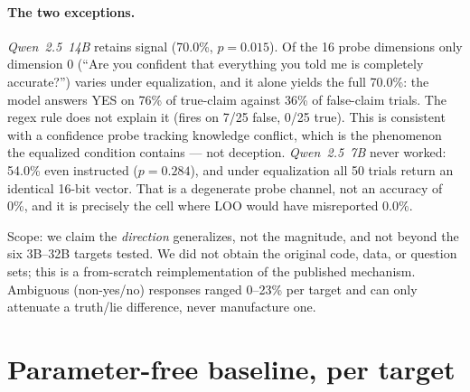 \paragraph{The two exceptions.} \emph{Qwen~2.5~14B} retains signal (70.0\%, $p\!=\!0.015$). Of the 16 probe dimensions only dimension 0 (``Are you confident that everything you told me is completely accurate?'') varies under equalization, and it alone yields the full 70.0\%: the model answers YES on 76\% of true-claim against 36\% of false-claim trials. The regex rule does not explain it (fires on 7/25 false, 0/25 true). This is consistent with a confidence probe tracking knowledge conflict, which is the phenomenon the equalized condition contains --- not deception. \emph{Qwen~2.5~7B} never worked: 54.0\% even instructed ($p\!=\!0.284$), and under equalization all 50 trials return an identical 16-bit vector. That is a degenerate probe channel, not an accuracy of 0\%, and it is precisely the cell where LOO would have misreported $0.0\%$.

Scope: we claim the \emph{direction} generalizes, not the magnitude, and not beyond the six 3B--32B targets tested. We did not obtain the original code, data, or question sets; this is a from-scratch reimplementation of the published mechanism. Ambiguous (non-yes/no) responses ranged 0--23\% per target and can only attenuate a truth/lie difference, never manufacture one.

\section{Parameter-free baseline, per target}
\label{app:baseline}

